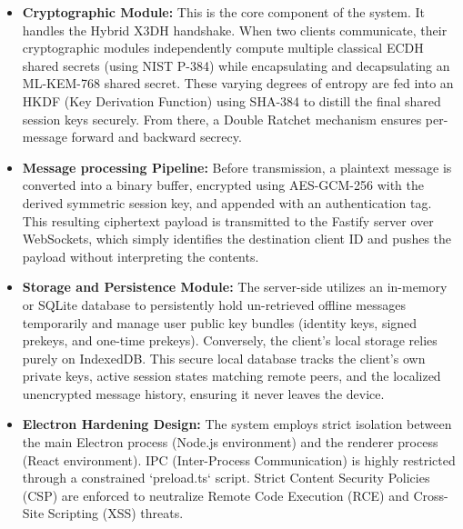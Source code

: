 \begin{itemize}
    \item \textbf{Cryptographic Module:} This is the core component of the system. It handles the Hybrid X3DH handshake. When two clients communicate, their cryptographic modules independently compute multiple classical ECDH shared secrets (using NIST P-384) while encapsulating and decapsulating an ML-KEM-768 shared secret. These varying degrees of entropy are fed into an HKDF (Key Derivation Function) using SHA-384 to distill the final shared session keys securely. From there, a Double Ratchet mechanism ensures per-message forward and backward secrecy.
    \item \textbf{Message processing Pipeline:} Before transmission, a plaintext message is converted into a binary buffer, encrypted using AES-GCM-256 with the derived symmetric session key, and appended with an authentication tag. This resulting ciphertext payload is transmitted to the Fastify server over WebSockets, which simply identifies the destination client ID and pushes the payload without interpreting the contents.
    \item \textbf{Storage and Persistence Module:} The server-side utilizes an in-memory or SQLite database to persistently hold un-retrieved offline messages temporarily and manage user public key bundles (identity keys, signed prekeys, and one-time prekeys). Conversely, the client's local storage relies purely on IndexedDB. This secure local database tracks the client's own private keys, active session states matching remote peers, and the localized unencrypted message history, ensuring it never leaves the device.
    \item \textbf{Electron Hardening Design:} The system employs strict isolation between the main Electron process (Node.js environment) and the renderer process (React environment). IPC (Inter-Process Communication) is highly restricted through a constrained `preload.ts` script. Strict Content Security Policies (CSP) are enforced to neutralize Remote Code Execution (RCE) and Cross-Site Scripting (XSS) threats.
\end{itemize}
